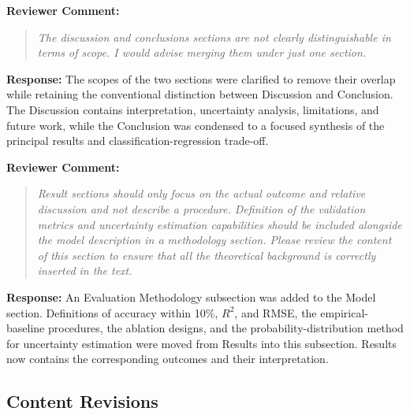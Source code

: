 \documentclass[a4paper,12pt]{article}
\newcommand{\reviewercomment}[1]{%
  \begin{samepage}%
  \par\noindent\textbf{Reviewer Comment:}\par
  \begin{quote}\itshape #1\end{quote}}
\newcommand{\filledresponse}[1]{%
  \par\noindent\textbf{Response:} #1\par
  \vspace{0.4cm}%
  \end{samepage}}
\begin{document}
\reviewercomment{The discussion and conclusions sections are not clearly distinguishable in terms of scope. I would
advise merging them under just one section.}
\filledresponse{The scopes of the two sections were clarified to remove their overlap while
retaining the conventional distinction between Discussion and Conclusion. The Discussion contains
interpretation, uncertainty analysis, limitations, and future work, while the Conclusion was
condensed to a focused synthesis of the principal results and classification-regression trade-off.}

\reviewercomment{Result sections should only focus on the actual outcome and relative discussion and not describe a
procedure. Definition of the validation metrics and uncertainty estimation capabilities should be
included alongside the model description in a methodology section. Please review the content of this
section to ensure that all the theoretical background is correctly inserted in the text.}
\filledresponse{An Evaluation Methodology subsection was added to the Model section. Definitions of
accuracy within 10\%, $R^2$, and RMSE, the empirical-baseline procedures, the ablation designs, and
the probability-distribution method for uncertainty estimation were moved from Results into this
subsection. Results now contains the corresponding outcomes and their interpretation.}

\subsection*{Content Revisions}
\end{document}
